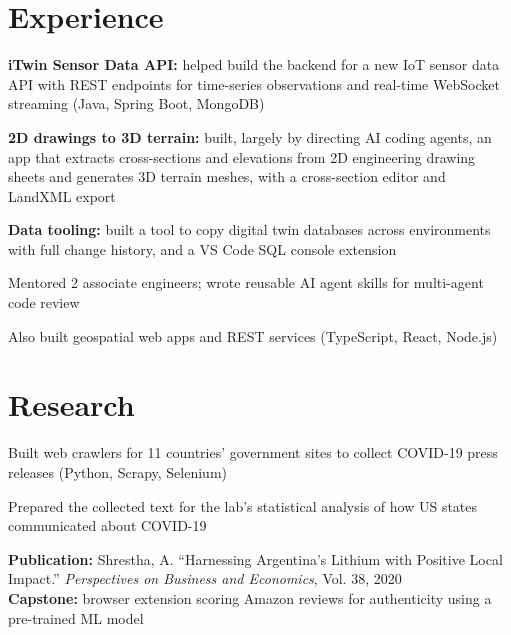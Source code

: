 \documentclass[]{deedy-resume-openfont}
\begin{document}
\begin{minipage}[t]{0.67\textwidth}

\section{Experience}
\vspace{\topsep}
\begin{tightemize}
\item {\bf iTwin Sensor Data API:} helped build the backend for a new IoT sensor data API with REST endpoints for time-series observations and real-time WebSocket streaming (Java, Spring Boot, MongoDB)
\item {\bf 2D drawings to 3D terrain:} built, largely by directing AI coding agents, an app that extracts cross-sections and elevations from 2D engineering drawing sheets and generates 3D terrain meshes, with a cross-section editor and LandXML export
\item {\bf Data tooling:} built a tool to copy digital twin databases across environments with full change history, and a VS Code SQL console extension
\item Mentored 2 associate engineers; wrote reusable AI agent skills for multi-agent code review
\item Also built geospatial web apps and REST services (TypeScript, React, Node.js)
\end{tightemize}
\sectionsep

\section{Research}
\begin{tightemize}
\item Built web crawlers for 11 countries' government sites to collect COVID-19 press releases (Python, Scrapy, Selenium)
\item Prepared the collected text for the lab's statistical analysis of how US states communicated about COVID-19
\end{tightemize}
\vspace{4pt}
{\bf Publication:} Shrestha, A. ``Harnessing Argentina's Lithium with Positive Local Impact.'' \textit{Perspectives on Business and Economics}, Vol. 38, 2020 \\
{\bf Capstone:} browser extension scoring Amazon reviews for authenticity using a pre-trained ML model
\sectionsep


\end{minipage}
\end{document}
